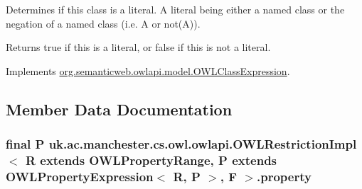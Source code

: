 Determines if this class is a literal. A literal being either a named class or the negation of a named class (i.\-e. A or not(\-A)). \begin{DoxyReturn}{Returns}
{\ttfamily true} if this is a literal, or false if this is not a literal. 
\end{DoxyReturn}


Implements \hyperlink{interfaceorg_1_1semanticweb_1_1owlapi_1_1model_1_1_o_w_l_class_expression_aa209626b5e5a33649a50cb0c4ac7de1f}{org.\-semanticweb.\-owlapi.\-model.\-O\-W\-L\-Class\-Expression}.



\subsection{Member Data Documentation}
\hypertarget{classuk_1_1ac_1_1manchester_1_1cs_1_1owl_1_1owlapi_1_1_o_w_l_restriction_impl_3_01_r_01extends_07a3269898cc55de4409f398a643a25a6_a62a04c57a027c2dda62b2eba4b4ed614}{
\subsubsection[{property}]{\setlength{\rightskip}{0pt plus 5cm}final P uk.\-ac.\-manchester.\-cs.\-owl.\-owlapi.\-O\-W\-L\-Restriction\-Impl$<$ R extends {\bf O\-W\-L\-Property\-Range}, P extends O\-W\-L\-Property\-Expression$<$ R, P $>$, F $>$.property\hspace{0.3cm}{\ttfamily [private]}}}\label{classuk_1_1ac_1_1manchester_1_1cs_1_1owl_1_1owlapi_1_1_o_w_l_restriction_impl_3_01_r_01extends_07a3269898cc55de4409f398a643a25a6_a62a04c57a027c2dda62b2eba4b4ed614}
